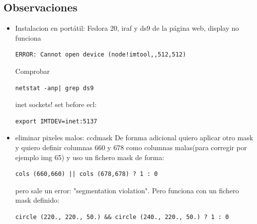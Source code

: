 \documentclass{article}
\begin{document}
\subsection*{Observaciones}
\begin{itemize}
\item Instalacion en portátil: Fedora 20, iraf y ds9 de la página web, display no funciona

\begin{verbatim}
ERROR: Cannot open device (node!imtool,,512,512)
\end{verbatim}
Comprobar 
\begin{verbatim}
netstat -anp| grep ds9
\end{verbatim}
inet sockets! set before ecl:
\begin{verbatim}
export IMTDEV=inet:5137
\end{verbatim}

\item eliminar pixeles malos: ccdmask
De fornma adicional quiero aplicar otro mask y quiero definir columnas 660 y 678 como columnas malas(para corregir por ejemplo img 65) y uso un fichero mask de forma:
\begin{verbatim}
cols (660,660) || cols (678,678) ? 1 : 0
\end{verbatim}
pero sale un error: "segmentation violation". Pero funciona con un fichero mask definido:
\begin{verbatim}
circle (220., 220., 50.) && circle (240., 220., 50.) ? 1 : 0
\end{verbatim}





\end{itemize}
\end{document}
